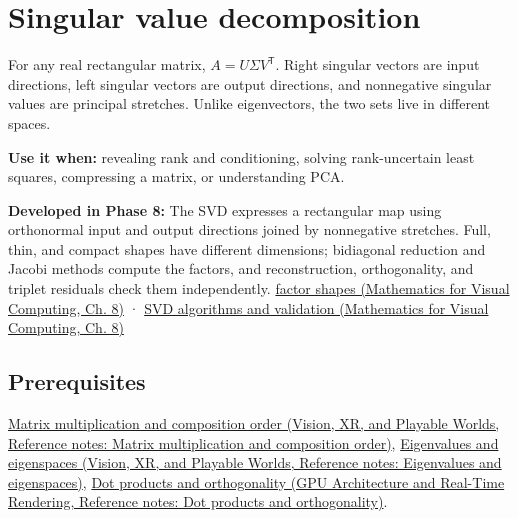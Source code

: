 \hypertarget{appendix-1fad5e7f36fa}{}\label{referencestart:appendix-1fad5e7f36fa}
\section{Singular value decomposition}\label{appendix-1fad5e7f36fa-singular-value-decomposition}

\hypertarget{appendix-1fad5e7f36fa-singular-value-decomposition}{}

For any real rectangular matrix, \(A=U\Sigma V^\mathsf T\). Right singular vectors are input directions, left singular vectors are output directions, and nonnegative singular values are principal stretches. Unlike eigenvectors, the two sets live in different spaces.

\textbf{Use it when:} revealing rank and conditioning, solving rank-uncertain least squares, compressing a matrix, or understanding PCA.

\textbf{Developed in Phase 8:} The SVD expresses a rectangular map using orthonormal input and output directions joined by nonnegative stretches. Full, thin, and compact shapes have different dimensions; bidiagonal reduction and Jacobi methods compute the factors, and reconstruction, orthogonality, and triplet residuals check them independently. \href{../02-Mathematics-for-Visual-Computing/main.pdf\#nameddest=02-foundations-ii-ch024-full-thin-and-compact-shapes-for-tall-and-wide-matrices}{factor shapes (Mathematics for Visual Computing, Ch. 8)} · \href{../02-Mathematics-for-Visual-Computing/main.pdf\#nameddest=02-foundations-ii-ch024-how-numerical-software-computes-and-checks-an-svd}{SVD algorithms and validation (Mathematics for Visual Computing, Ch. 8)}

\subsection{Prerequisites}\label{appendix-1fad5e7f36fa-prerequisites}

\hypertarget{appendix-1fad5e7f36fa-prerequisites}{}

\href{../07-Vision-XR-and-Playable-Worlds/main.pdf\#nameddest=appendix-ab31ef447dbf}{Matrix multiplication and composition order (Vision, XR, and Playable Worlds, Reference notes: Matrix multiplication and composition order)}, \href{../07-Vision-XR-and-Playable-Worlds/main.pdf\#nameddest=appendix-0b3be18411f9}{Eigenvalues and eigenspaces (Vision, XR, and Playable Worlds, Reference notes: Eigenvalues and eigenspaces)}, \href{../06-GPU-Architecture-and-Real-Time-Rendering/main.pdf\#nameddest=appendix-8bc4e8fc547c}{Dot products and orthogonality (GPU Architecture and Real-Time Rendering, Reference notes: Dot products and orthogonality)}.

